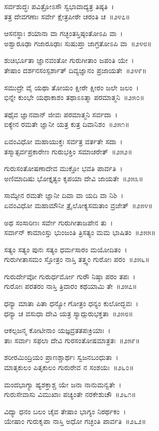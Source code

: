 ಸರ್ವಶುದ್ಧಃ ಪವಿತ್ರೋಽಸೌ ಸ್ವಭಾವಾದ್ಯತ್ರ ತಿಷ್ಠತಿ~।\\
ತತ್ರ ದೇವಗಣಾಃ ಸರ್ವೇ ಕ್ಷೇತ್ರಪೀಠೇ ಚರಂತಿ ಚ~॥೨೪೭॥

ಆಸನಸ್ಥಾಃ ಶಯಾನಾ ವಾ ಗಚ್ಛಂತಸ್ತಿಷ್ಠಂತೋಽಪಿ ವಾ~।\\
ಅಶ್ವಾರೂಢಾ ಗಜಾರೂಢಾಃ ಸುಷುಪ್ತಾ ಜಾಗ್ರತೋಽಪಿ ವಾ~॥೨೪೮॥

ಶುಚಿರ್ಭೂತಾ ಜ್ಞಾನವಂತೋ ಗುರುಗೀತಾಂ ಜಪಂತಿ ಯೇ~।\\
ತೇಷಾಂ ದರ್ಶನಸಂಸ್ಪರ್ಶಾತ್ ದಿವ್ಯಜ್ಞಾನಂ ಪ್ರಜಾಯತೇ~॥೨೪೯॥

ಸಮುದ್ರೇ ವೈ ಯಥಾ ತೋಯಂ ಕ್ಷೀರೇ ಕ್ಷೀರಂ ಜಲೇ ಜಲಂ~।\\
ಭಿನ್ನೇ ಕುಂಭೇ ಯಥಾಕಾಶಂ ತಥಾಽಽತ್ಮಾ ಪರಮಾತ್ಮನಿ~॥೨೫೦॥

ತಥೈವ ಜ್ಞಾನವಾನ್ ಜೀವಃ ಪರಮಾತ್ಮನಿ ಸರ್ವದಾ~।\\
ಐಕ್ಯೇನ ರಮತೇ ಜ್ಞಾನೀ ಯತ್ರ ಕುತ್ರ ದಿವಾನಿಶಂ~॥೨೫೧॥

ಏವಂವಿಧೋ ಮಹಾಯುಕ್ತಃ ಸರ್ವತ್ರ ವರ್ತತೇ ಸದಾ~।\\
ತಸ್ಮಾತ್ಸರ್ವಪ್ರಕಾರೇಣ ಗುರುಭಕ್ತಿಂ ಸಮಾಚರೇತ್~॥೨೫೨॥

ಗುರುಸಂತೋಷಣಾದೇವ ಮುಕ್ತೋ ಭವತಿ ಪಾರ್ವತಿ~।\\
ಅಣಿಮಾದಿಷು ಭೋಕ್ತೃತ್ವಂ ಕೃಪಯಾ ದೇವಿ ಜಾಯತೇ~॥೨೫೩॥

ಸಾಮ್ಯೇನ ರಮತೇ ಜ್ಞಾನೀ ದಿವಾ ವಾ ಯದಿ ವಾ ನಿಶಿ~।\\
ಏವಂವಿಧೋ ಮಹಾಮೌನೀ ತ್ರೈಲೋಕ್ಯಸಮತಾಂ ವ್ರಜೇತ್~॥೨೫೪॥

ಅಥ ಸಂಸಾರಿಣಃ ಸರ್ವೇ ಗುರುಗೀತಾಜಪೇನ ತು~।\\
ಸರ್ವಾನ್ ಕಾಮಾಂಸ್ತು ಭುಂಜಂತಿ ತ್ರಿಸತ್ಯಂ ಮಮ ಭಾಷಿತಂ~॥೨೫೫॥

ಸತ್ಯಂ ಸತ್ಯಂ ಪುನಃ ಸತ್ಯಂ ಧರ್ಮಸಾರಂ ಮಯೋದಿತಂ~।\\
ಗುರುಗೀತಾಸಮಂ ಸ್ತೋತ್ರಂ ನಾಸ್ತಿ ತತ್ತ್ವಂ ಗುರೋಃ ಪರಂ~॥೨೫೬॥

ಗುರುರ್ದೇವೋ ಗುರುರ್ಧರ್ಮೋ ಗುರೌ ನಿಷ್ಠಾ ಪರಂ ತಪಃ~।\\
ಗುರೋಃ ಪರತರಂ ನಾಸ್ತಿ ತ್ರಿವಾರಂ ಕಥಯಾಮಿ ತೇ~॥೨೫೭॥

ಧನ್ಯಾ ಮಾತಾ ಪಿತಾ ಧನ್ಯೋ ಗೋತ್ರಂ ಧನ್ಯಂ ಕುಲೋದ್ಭವಃ~।\\
ಧನ್ಯಾ ಚ ವಸುಧಾ ದೇವಿ ಯತ್ರ ಸ್ಯಾದ್ಗುರುಭಕ್ತತಾ~॥೨೫೮॥

ಆಕಲ್ಪಜನ್ಮ ಕೋಟೀನಾಂ ಯಜ್ಞವ್ರತತಪಃಕ್ರಿಯಾಃ~।\\
ತಾಃ ಸರ್ವಾಃ ಸಫಲಾ ದೇವಿ ಗುರಸಂತೋಷಮಾತ್ರತಃ~॥೨೫೯॥

ಶರೀರಮಿಂದ್ರಿಯಂ ಪ್ರಾಣಶ್ಚಾರ್ಥಃ ಸ್ವಜನಬಂಧುತಾ~।\\
ಮಾತೃಕುಲಂ ಪಿತೃಕುಲಂ ಗುರುರೇವ ನ ಸಂಶಯಃ~॥೨೬೦॥

ಮಂದಭಾಗ್ಯಾ ಹ್ಯಶಕ್ತಾಶ್ಚ ಯೇ ಜನಾ ನಾನುಮನ್ವತೇ~।\\
ಗುರುಸೇವಾಸು ವಿಮುಖಾಃ ಪಚ್ಯಂತೇ ನರಕೇಶುಚೌ~॥೨೬೧॥

ವಿದ್ಯಾ ಧನಂ ಬಲಂ ಚೈವ ತೇಷಾಂ ಭಾಗ್ಯಂ ನಿರರ್ಥಕಂ~।\\
ಯೇಷಾಂ ಗುರುಕೃಪಾ ನಾಸ್ತಿ ಅಧೋ ಗಚ್ಛಂತಿ ಪಾರ್ವತಿ~॥೨೬೨॥

